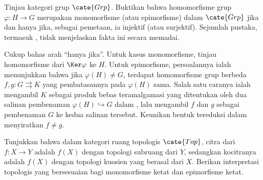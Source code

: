 \begin{Exercises}
	\item Tinjau kategori grup $\cate{Grp}$. Buktikan bahwa homomorfisme grup
	$\varphi:H\to G$ merupakan monomorfisme (atau epimorfisme) dalam
	$\cate{Grp}$ jika dan hanya jika, sebagai pemetaan, ia injektif (atau
	surjektif). Sejumlah pustaka, termasuk \cite{Li1}, tidak menjelaskan fakta
	ini secara memadai.

	\begin{hint}
		Cukup bahas arah ``hanya jika''. Untuk kasus monomorfisme, tinjau
		homomorfisme dari $\Ker\varphi$ ke $H$. Untuk epimorfisme, persoalannya
		ialah menunjukkan bahwa jika $\varphi(H)\neq G$, terdapat homomorfisme
		grup berbeda $f,g:G\rightrightarrows K$ yang pembatasannya pada
		$\varphi(H)$ sama. Salah satu caranya ialah mengambil $K$ sebagai produk
		bebas teramalgamasi yang ditentukan oleh dua salinan pembenaman
		$\varphi(H)\hookrightarrow G$ dalam \cite[Definisi 4.8.5]{Li1}, lalu
		mengambil $f$ dan $g$ sebagai pembenaman $G$ ke kedua salinan tersebut.
		Keunikan bentuk tereduksi dalam \cite[Lema 4.8.7]{Li1} menyiratkan
		$f\neq g$.
	\end{hint}

	\item Tunjukkan bahwa dalam kategori ruang topologis $\cate{Top}$, citra
	dari $f:X\to Y$ adalah $f(X)$ dengan topologi subruang dari $Y$, sedangkan
	kocitranya adalah $f(X)$ dengan topologi kuosien yang berasal dari $X$.
	Berikan interpretasi topologis yang bersesuaian bagi monomorfisme ketat dan
	epimorfisme ketat.


\end{Exercises}
